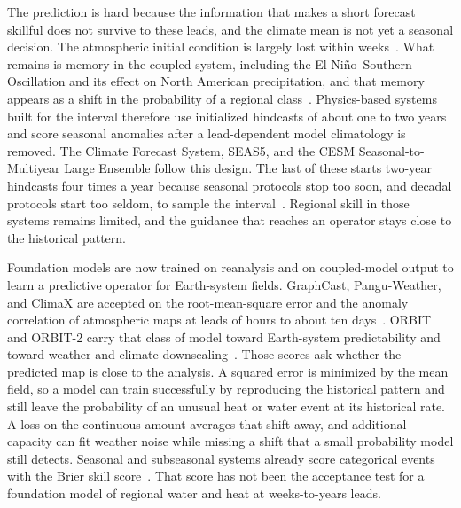 \documentclass{ametsocV6.2}
\begin{document}
The prediction is hard because the information that makes a short forecast skillful does not survive to these leads, and the climate mean is not yet a seasonal decision.
The atmospheric initial condition is largely lost within weeks~\citep{vitart2017s2s}.
What remains is memory in the coupled system, including the El Ni\~no--Southern Oscillation and its effect on North American precipitation, and that memory appears as a shift in the probability of a regional class~\citep{ropelewski1986enso,hong2025enso}.
Physics-based systems built for the interval therefore use initialized hindcasts of about one to two years and score seasonal anomalies after a lead-dependent model climatology is removed.
The Climate Forecast System, SEAS5, and the CESM Seasonal-to-Multiyear Large Ensemble follow this design.
The last of these starts two-year hindcasts four times a year because seasonal protocols stop too soon, and decadal protocols start too seldom, to sample the interval~\citep{saha2014cfsv2,johnson2019seas5,yeager2022smyle}.
Regional skill in those systems remains limited, and the guidance that reaches an operator stays close to the historical pattern.

Foundation models are now trained on reanalysis and on coupled-model output to learn a predictive operator for Earth-system fields.
GraphCast, Pangu-Weather, and ClimaX are accepted on the root-mean-square error and the anomaly correlation of atmospheric maps at leads of hours to about ten days~\citep{lam2023graphcast,bi2023pangu,nguyen2023climax}.
ORBIT and ORBIT-2 carry that class of model toward Earth-system predictability and toward weather and climate downscaling~\citep{wang2024orbit,wang2025orbit2}.
Those scores ask whether the predicted map is close to the analysis.
A squared error is minimized by the mean field, so a model can train successfully by reproducing the historical pattern and still leave the probability of an unusual heat or water event at its historical rate.
A loss on the continuous amount averages that shift away, and additional capacity can fit weather noise while missing a shift that a small probability model still detects.
Seasonal and subseasonal systems already score categorical events with the Brier skill score~\citep{vitart2017s2s,kirtman2014nmme}.
That score has not been the acceptance test for a foundation model of regional water and heat at weeks-to-years leads.
\end{document}
